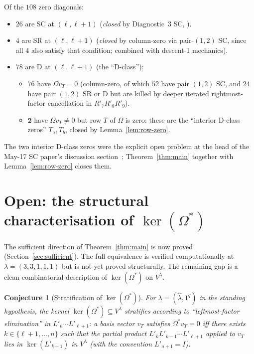 \documentclass[11pt]{article}
\newtheorem{conjecture}[theorem]{Conjecture}
\theoremstyle{definition}
\newcommand{\Vlam}{V^\lambda}
\newcommand{\Om}{\Omega}
\newcommand{\Omstar}{\Omega^{\ast}}
\newcommand{\hatl}{\widehat\lambda}
\newcommand{\Rp}{{R'}}
\newcommand{\Lp}{{L'}}
\begin{document}
Of the $108$ zero diagonals:
\begin{itemize}[topsep=0.2em,itemsep=0.1em]
\item $26$ are SC at $(\ell, \ell+1)$ (\emph{closed} by Diagnostic~3 SC,
   \cite{leftmostPerSYT}).
\item $4$ are SR at $(\ell, \ell+1)$ (\emph{closed} by column-zero via
   pair-$(1,2)$ SC, since all $4$ also satisfy that condition; combined
   with descent-1 mechanics).
\item $78$ are D at $(\ell, \ell+1)$ (the ``D-class''):
   \begin{itemize}[label=$\circ$,topsep=0.2em,itemsep=0.1em]
   \item $76$ have $\Om v_T = 0$ (column-zero, of which $52$ have pair
      $(1, 2)$ SC, and $24$ have pair $(1, 2)$ SR or D but are killed by
      deeper iterated rightmost-factor cancellation in $\Rp_7 \Rp_8 \Rp_9$).
   \item $\mathbf{2}$ have $\Om v_T \neq 0$ but row $T$ of $\Om$ is zero:
      these are the ``interior D-class zeros'' $T_a, T_b$, closed by
      Lemma~\ref{lem:row-zero}.
   \end{itemize}
\end{itemize}

The two interior D-class zeros were the explicit open problem at the head
of the May-17 SC paper's discussion section~\cite[\S5.3]{leftmostPerSYT};
Theorem~\ref{thm:main} together with Lemma~\ref{lem:row-zero} closes them.

\section{Open: the structural characterisation of $\ker(\Omstar)$}\label{sec:open}

The sufficient direction of Theorem~\ref{thm:main} is now proved
(Section~\ref{sec:sufficient}). The full equivalence is verified
computationally at $\lambda = (3,3,1,1,1)$ but is not yet proved
structurally. The remaining gap is a clean combinatorial description of
$\ker(\Omstar)$ on $\Vlam$.

\begin{conjecture}[Stratification of $\ker(\Omstar)$]\label{conj:kerstar}
For $\lambda = (\hatl, 1^q)$ in the standing hypothesis, the kernel
$\ker(\Omstar) \subseteq \Vlam$ stratifies according to ``leftmost-factor
elimination'' in $\Lp_n \cdots \Lp_{\ell+1}$: a basis vector $v_T$
satisfies $\Omstar v_T = 0$ iff there exists $k \in \{\ell+1, \ldots, n\}$
such that the partial product $\Lp_k \Lp_{k-1} \cdots \Lp_{\ell+1}$
applied to $v_T$ lies in
$\ker(\Lp_{k+1})$ in $\Vlam$ (with the convention $\Lp_{n+1} = I$).
\end{conjecture}
\end{document}
